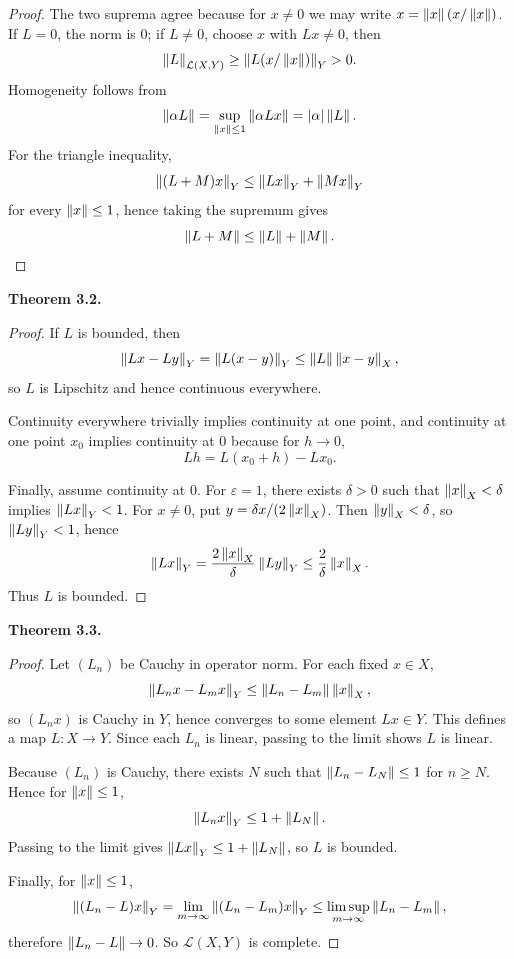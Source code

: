 \documentclass[11pt]{article}
\newenvironment{theoremstmt}[1]{%
  \par\medskip\noindent\textbf{Theorem #1. }\itshape
}{\par\medskip}
\begin{document}
\begin{proof}
The two suprema agree because for $x\neq 0$ we may write $x=\left\lVert x\right\rVert(x/\left\lVert x\right\rVert)$. If $L=0$, the norm is $0$; if $L\neq 0$, choose $x$ with $Lx\neq 0$, then
\[
\left\lVert L\right\rVert_{\mathcal L(X,Y)}\ge \left\lVert L(x/\left\lVert x\right\rVert)\right\rVert_Y>0.
\]
Homogeneity follows from
\[
\left\lVert \alpha L\right\rVert=\sup_{\left\lVert x\right\rVert\le 1}\left\lVert \alpha Lx\right\rVert=\left\lvert \alpha\right\rvert\left\lVert L\right\rVert.
\]
For the triangle inequality,
\[
\left\lVert (L+M)x\right\rVert_Y\le \left\lVert Lx\right\rVert_Y+\left\lVert Mx\right\rVert_Y
\]
for every $\left\lVert x\right\rVert\le 1$, hence taking the supremum gives
\[
\left\lVert L+M\right\rVert\le \left\lVert L\right\rVert+\left\lVert M\right\rVert.
\]
\end{proof}

\begin{theoremstmt}{3.2}
\thmBoundedIffContinuous
\end{theoremstmt}

\begin{proof}
If $L$ is bounded, then
\[
\left\lVert Lx-Ly\right\rVert_Y=\left\lVert L(x-y)\right\rVert_Y\le \left\lVert L\right\rVert\left\lVert x-y\right\rVert_X,
\]
so $L$ is Lipschitz and hence continuous everywhere.

Continuity everywhere trivially implies continuity at one point, and continuity at one point $x_0$ implies continuity at $0$ because for $h\to 0$,
\[
Lh=L(x_0+h)-Lx_0.
\]

Finally, assume continuity at $0$. For $\varepsilon=1$, there exists $\delta>0$ such that $\left\lVert x\right\rVert_X<\delta$ implies $\left\lVert Lx\right\rVert_Y<1$. For $x\neq 0$, put $y=\delta x/(2\left\lVert x\right\rVert_X)$. Then $\left\lVert y\right\rVert_X<\delta$, so $\left\lVert Ly\right\rVert_Y<1$, hence
\[
\left\lVert Lx\right\rVert_Y=\frac{2\left\lVert x\right\rVert_X}{\delta}\left\lVert Ly\right\rVert_Y\le \frac{2}{\delta}\left\lVert x\right\rVert_X.
\]
Thus $L$ is bounded.
\end{proof}

\begin{theoremstmt}{3.3}
\thmDualIsBanach
\end{theoremstmt}

\begin{proof}
Let $(L_n)$ be Cauchy in operator norm. For each fixed $x\in X$,
\[
\left\lVert L_nx-L_mx\right\rVert_Y\le \left\lVert L_n-L_m\right\rVert\left\lVert x\right\rVert_X,
\]
so $(L_nx)$ is Cauchy in $Y$, hence converges to some element $Lx\in Y$. This defines a map $L:X\to Y$. Since each $L_n$ is linear, passing to the limit shows $L$ is linear.

Because $(L_n)$ is Cauchy, there exists $N$ such that $\left\lVert L_n-L_N\right\rVert\le 1$ for $n\ge N$. Hence for $\left\lVert x\right\rVert\le 1$,
\[
\left\lVert L_nx\right\rVert_Y\le 1+\left\lVert L_N\right\rVert.
\]
Passing to the limit gives $\left\lVert Lx\right\rVert_Y\le 1+\left\lVert L_N\right\rVert$, so $L$ is bounded.

Finally, for $\left\lVert x\right\rVert\le 1$,
\[
\left\lVert (L_n-L)x\right\rVert_Y=\lim_{m\to\infty}\left\lVert (L_n-L_m)x\right\rVert_Y\le \limsup_{m\to\infty}\left\lVert L_n-L_m\right\rVert,
\]
therefore $\left\lVert L_n-L\right\rVert\to 0$. So $\mathcal L(X,Y)$ is complete.
\end{proof}
\end{document}

